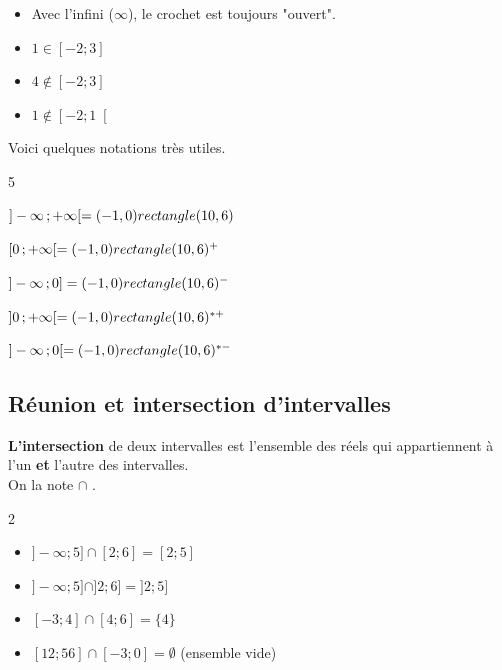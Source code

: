 \begin{Remarque} 
\vspace{-0.5cm}
\begin{itemize}[label=\textcolor{Couleur7}{$\bullet$}]
\item Avec l'infini ($\infty$), le crochet est toujours "ouvert".
\item $1 \in \left[ -2 ; 3\right ]$
\item $4 \notin \left[ -2 ; 3\right ]$
\item $1 \notin \left[ -2 ; 1\right [$
\end{itemize}
\end{Remarque}


\newpage


\begin{Remarque}
Voici quelques notations très utiles.
\begin{multicols}{5}
\item $]-\infty \mathpunct{} ; +\infty [ =(-1,0) rectangle (10,6)$
\item $ [ 0 \mathpunct{} ; +\infty [ = (-1,0) rectangle (10,6)^+$
\item $]-\infty \mathpunct{} ; 0 ] =(-1,0) rectangle (10,6)^-$
\item $ ] 0 \mathpunct{} ; +\infty [ = (-1,0) rectangle (10,6)^{\ast+}$
\item $]-\infty \mathpunct{} ; 0 [ =(-1,0) rectangle (10,6)^{\ast-}$
\end{multicols}
\end{Remarque}

\subsection{Réunion et intersection d'intervalles}

\begin{Définition}
{\bf{L'intersection}} de deux intervalles est l'ensemble des réels qui appartiennent à l'un {\bf{et}} l'autre des intervalles. \\
On la note $\cap$ .
\end{Définition}

\begin{Exemples} 
\leavevmode\vspace{-\baselineskip}
\vspace{-0.5cm}
\setlength{\columnsep}{2cm}
\begin{multicols}{2}
\begin{itemize}[label=\textcolor{Couleur10}{$\bullet$}]
\item $]-\infty\mathpunct{} ;5]\cap[2\mathpunct{} ;6]=[2\mathpunct{} ;5]$
\item $]-\infty\mathpunct{} ;5]\cap]2\mathpunct{} ;6]=]2\mathpunct{} ;5]$
\item $[-3\mathpunct{} ;4]\cap[4\mathpunct{} ;6]=\{4\}$
\item $[12\mathpunct{} ;56]\cap[-3\mathpunct{} ;0]=\emptyset$ (ensemble vide)
\end{itemize}
\end{multicols}
\end{Exemples}

